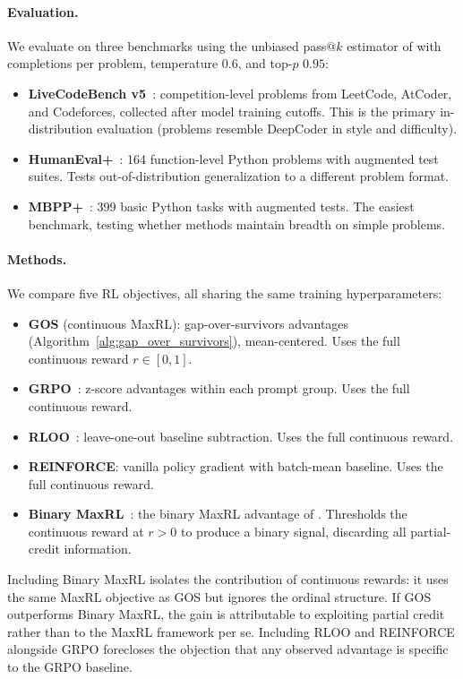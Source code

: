 \paragraph{Evaluation.} We evaluate on three benchmarks using the unbiased pass@$k$ estimator of \citet{chen2021evaluating} with  completions per problem, temperature $0.6$, and top-$p$ $0.95$:
\begin{itemize}[leftmargin=2em,itemsep=2pt]
  \item \textbf{LiveCodeBench v5}~\citep{jain2024livecodebench}:  competition-level problems from LeetCode, AtCoder, and Codeforces, collected after model training cutoffs. This is the primary in-distribution evaluation (problems resemble DeepCoder in style and difficulty).
  \item \textbf{HumanEval+}~\citep{liu2024evalplus}: 164 function-level Python problems with augmented test suites. Tests out-of-distribution generalization to a different problem format.
  \item \textbf{MBPP+}~\citep{liu2024evalplus}: 399 basic Python tasks with augmented tests. The easiest benchmark, testing whether methods maintain breadth on simple problems.
\end{itemize}

\paragraph{Methods.} We compare five RL objectives, all sharing the same training hyperparameters:
\begin{itemize}[leftmargin=2em,itemsep=2pt]
  \item \textbf{GOS} (continuous MaxRL): gap-over-survivors advantages (Algorithm~\ref{alg:gap_over_survivors}), mean-centered. Uses the full continuous reward $r \in [0,1]$.
  \item \textbf{GRPO}~\citep{shao2024deepseekmath}: z-score advantages within each prompt group. Uses the full continuous reward.
  \item \textbf{RLOO}~\citep{ahmadian2024rloo}: leave-one-out baseline subtraction. Uses the full continuous reward.
  \item \textbf{REINFORCE}: vanilla policy gradient with batch-mean baseline. Uses the full continuous reward.
  \item \textbf{Binary MaxRL}~\citep{tajwar2026maxrl}: the binary MaxRL advantage of \citet{tajwar2026maxrl}. Thresholds the continuous reward at $r > 0$ to produce a binary signal, discarding all partial-credit information.
\end{itemize}
Including Binary MaxRL isolates the contribution of continuous rewards: it uses the same MaxRL objective as GOS but ignores the ordinal structure. If GOS outperforms Binary MaxRL, the gain is attributable to exploiting partial credit rather than to the MaxRL framework per se. Including RLOO and REINFORCE alongside GRPO forecloses the objection that any observed advantage is specific to the GRPO baseline.

